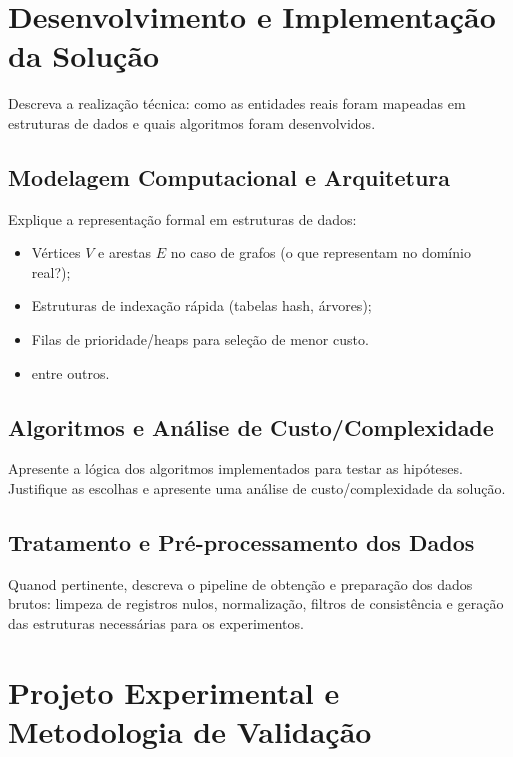\documentclass[11pt,a4paper]{article}
\begin{document}
\section{Desenvolvimento e Implementação da Solução}

\begin{instrucao}
Descreva a realização técnica: como as entidades reais foram mapeadas em estruturas de dados e quais algoritmos foram desenvolvidos.
\end{instrucao}

\subsection{Modelagem Computacional e Arquitetura}
Explique a representação formal em estruturas de dados:
\begin{itemize}
    \item Vértices $V$ e arestas $E$ no caso de grafos (o que representam no domínio real?);
    \item Estruturas de indexação rápida (tabelas hash, árvores);
    \item Filas de prioridade/heaps para seleção de menor custo.
    \item entre outros.
\end{itemize}

\subsection{Algoritmos e Análise de Custo/Complexidade}
Apresente a lógica dos algoritmos implementados para testar as hipóteses. Justifique as escolhas e apresente uma análise de custo/complexidade da solução.

\subsection{Tratamento e Pré-processamento dos Dados}
Quanod pertinente, descreva o pipeline de obtenção e preparação dos dados brutos: limpeza de registros nulos, normalização, filtros de consistência e geração das estruturas necessárias para os experimentos.

\section{Projeto Experimental e Metodologia de Validação}
\end{document}

